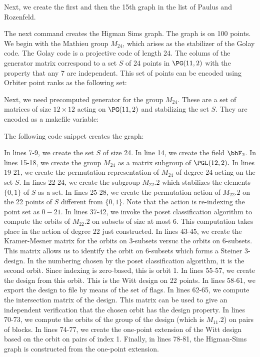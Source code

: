 Next, we create the first 
and then the 15th graph in the list of Paulus and Rozenfeld.


\bigskip


\bigskip

The next command creates the Higman Sims graph. The graph is on 100 points.
We begin with the Mathieu group $M_{24}$, which arises as the stabilizer of the Golay code.
The Golay code is a projective code of length 24. 
The colums of the generator matrix correspond to a set $S$ of 
24 points in $\PG(11,2)$ with the property that any 7 are independent. 
This set of points can be encoded using Orbiter point ranks as the following set:


Next, we need precomputed generator for the group $M_{24}$. These are a set of matrices of size $12 \times 12$ acting on $\PG(11,2)$ and stabilizing the set $S$. They
are encoded as a makefile variable: 


The following code snippet creates the graph:



In lines 7-9, we create the set $S$ of size 24. In line 14, we create the field $\bbF_2$. 
In lines 15-18, we create the group $M_{24}$ as a matrix subgroup of $\PGL(12,2).$
In lines 19-21, we create the permutation representation of $M_{24}$ of degree 24 
acting on the set $S$.
In lines 22-24, we create the subgroup $M_{22}.2$ 
which stabilizes the elements $\{0,1\}$ of $S$ as a set. 
In lines 25-28, we create the permutation action of $M_{22}.2$ 
on the 22 points of $S$ 
different from $\{0,1\}$. 
Note that the action is re-indexing the point set as $0-21.$
In lines 37-42, we invoke the poset classification algorithm 
to compute the orbits of $M_{22}.2$ 
on subsets of size at most 6. 
This computation takes place in the action of degree 22 just constructed. 
In lines 43-45, we create the Kramer-Mesner matrix for the orbits on $3$-subsets versuc the orbits on $6$-subsets. 
This matrix allows us to identify the orbit on $6$-subsets which forms 
a Steiner 3-design. 
In the numbering chosen by the poset classification algorithm, 
it is the second orbit. 
Since indexing is zero-based, this is orbit 1.
In lines 55-57, we create the design from this orbit.
This is the Witt design on 22 points. 
In lines 58-61, we export the design to file by means of the set of flags. 
In lines 62-65, we compute the intersection matrix of the design. 
This matrix can be used to give an independent verification that the chosen orbit has the design property. 
In lines 70-73, we compute the orbits of the group of the design (which is $M_{11}.2$) 
on pairs of blocks. 
In lines 74-77, we create the one-point extension of the Witt design based on the orbit on pairs of index 1. 
Finally, in lines 78-81, the Higman-Sims graph is constructed from the one-point extension. 










\bigskip

